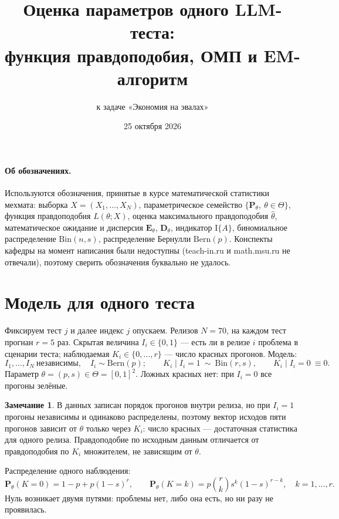 \documentclass[11pt,a4paper]{article}
\title{Оценка параметров одного LLM-теста:\\ функция правдоподобия, ОМП и EM-алгоритм}
\author{к задаче «Экономия на эвалах»}
\date{25 октября 2026}
\newcommand{\E}{\mathbf{E}}
\newcommand{\Prob}{\mathbf{P}}
\newcommand{\D}{\mathbf{D}}
\newcommand{\Ind}{\mathrm{I}}
\newcommand{\Bern}{\mathrm{Bern}}
\newcommand{\Bin}{\mathrm{Bin}}
\theoremstyle{plain}
\theoremstyle{definition}
\newtheorem{remark}{Замечание}
\begin{document}
\sloppy
\maketitle

\paragraph{Об обозначениях.} Используются обозначения, принятые в курсе математической статистики мехмата: выборка $X=(X_1,\dots,X_N)$, параметрическое семейство $\{\Prob_\theta,\ \theta\in\Theta\}$, функция правдоподобия $L(\theta;X)$, оценка максимального правдоподобия $\hat\theta$, математическое ожидание и дисперсия $\E_\theta$, $\D_\theta$, индикатор $\Ind\{A\}$, биномиальное распределение $\Bin(n,s)$, распределение Бернулли $\Bern(p)$. Конспекты кафедры на момент написания были недоступны (teach-in.ru и math.msu.ru не отвечали), поэтому сверить обозначения буквально не удалось.

\section{Модель для одного теста}

Фиксируем тест $j$ и далее индекс $j$ опускаем. Релизов $N=70$, на каждом тест прогнан $r=5$ раз. Скрытая величина $I_i\in\{0,1\}$ --- есть ли в релизе $i$ проблема в сценарии теста; наблюдаемая $K_i\in\{0,\dots,r\}$ --- число красных прогонов. Модель:
\[
I_1,\dots,I_N\ \text{независимы},\quad I_i\sim\Bern(p);\qquad K_i\mid I_i=1\ \sim\ \Bin(r,s),\qquad K_i\mid I_i=0\ \equiv 0 .
\]
Параметр $\theta=(p,s)\in\Theta=[0,1]^2$. Ложных красных нет: при $I_i=0$ все прогоны зелёные.

\begin{remark}
В данных записан порядок прогонов внутри релиза, но при $I_i=1$ прогоны независимы и одинаково распределены, поэтому вектор исходов пяти прогонов зависит от $\theta$ только через $K_i$: число красных --- достаточная статистика для одного релиза. Правдоподобие по исходным данным отличается от правдоподобия по $K_i$ множителем, не зависящим от $\theta$.
\end{remark}

Распределение одного наблюдения:
\begin{equation}\label{eq:pmf}
\Prob_\theta(K=0)=1-p+p(1-s)^r,\qquad
\Prob_\theta(K=k)=p\binom rk s^k(1-s)^{r-k},\quad k=1,\dots,r .
\end{equation}
Нуль возникает двумя путями: проблемы нет, либо она есть, но ни разу не проявилась.
\end{document}
